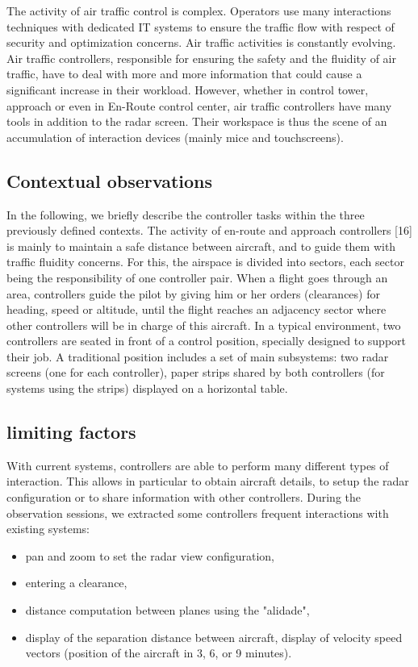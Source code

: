 The activity of air traffic control is complex. Operators use many interactions techniques with dedicated IT systems to ensure the traffic flow with respect of security and
optimization concerns. Air traffic activities is constantly evolving. Air traffic
controllers, responsible for ensuring the safety and the fluidity of air traffic, have to deal with more and more information that could cause a significant increase in their
workload. However, whether in control tower, approach or even in En-Route control center, air traffic controllers have many tools in addition to the radar screen. Their
workspace is thus the scene of an accumulation of interaction devices (mainly mice and touchscreens).

\subsection{ Contextual observations }

In the following, we briefly describe the controller tasks within the three previously defined contexts. The activity of en-route and approach controllers [16] is mainly to maintain a safe distance between aircraft, and to guide them with traffic fluidity concerns. For this, the airspace is divided into sectors, each sector being the responsibility of one controller pair. When a flight goes through an area, controllers guide
the pilot by giving him or her orders (clearances) for heading, speed or altitude, until the flight reaches an adjacency sector where other controllers will be in charge of
this aircraft. In a typical environment, two controllers are seated in front of a control position, specially designed to support their job. A traditional position includes a set of
main subsystems: two radar screens (one for each controller), paper strips shared by both controllers (for systems using the strips) displayed on a horizontal table.

\subsection{ limiting factors }

With current systems, controllers are able to perform many
different types of interaction. This allows in particular to
obtain aircraft details, to setup the radar configuration or to
share information with other controllers. During the
observation sessions, we extracted some controllers frequent
interactions with existing systems:
\begin{itemize}
\item pan and zoom to set the radar view configuration,
\item entering a clearance,
\item distance computation between planes using the "alidade",
\item display of the separation distance between aircraft,
display of velocity speed vectors (position of the aircraft in
3, 6, or 9 minutes).
\end{itemize}

